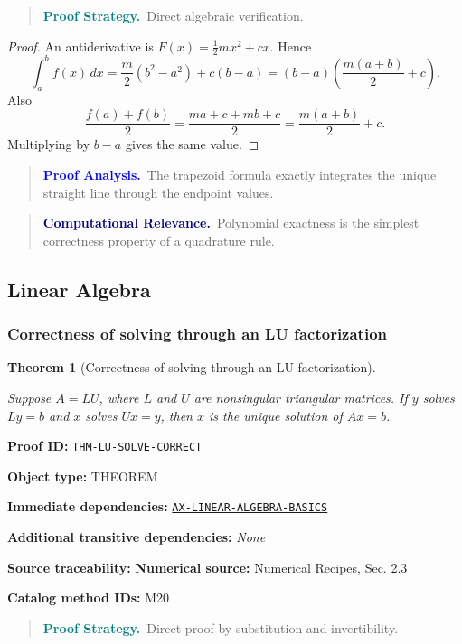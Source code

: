 \documentclass[10pt]{article}
\newcommand{\pidraw}[1]{\begingroup\urlstyle{tt}\nolinkurl{#1}\endgroup}
\newcommand{\pidref}[1]{\hyperref[prf:#1]{\pidraw{#1}}}
\newtheorem{theorem}{Theorem}[section]
\theoremstyle{definition}
\theoremstyle{remark}
\newenvironment{proofstrategy}
{\begin{quote}\small\noindent\textbf{\textcolor{teal}{Proof Strategy.}}\ }
{\end{quote}}
\newenvironment{proofanalysis}
{\begin{quote}\small\noindent\textbf{\textcolor{blue}{Proof Analysis.}}\ }
{\end{quote}}
\newenvironment{computationalrelevance}
{\begin{quote}\small\noindent\textbf{\textcolor{navy}{Computational Relevance.}}\ }
{\end{quote}}
\newcommand{\meta}[2]{\noindent\textbf{#1:} #2\par}
\begin{document}
\begin{proofstrategy}Direct algebraic verification.\end{proofstrategy}

\begin{proof}

An antiderivative is $F(x)=\tfrac12mx^2+cx$. Hence
\[
\int_a^b f(x)\,dx
=
\frac{m}{2}(b^2-a^2)+c(b-a)
=
(b-a)\left(\frac{m(a+b)}2+c\right).
\]
Also
\[
\frac{f(a)+f(b)}2
=
\frac{ma+c+mb+c}{2}
=
\frac{m(a+b)}2+c.
\]
Multiplying by $b-a$ gives the same value.

\end{proof}

\begin{proofanalysis}The trapezoid formula exactly integrates the unique straight line through the endpoint values.\end{proofanalysis}

\begin{computationalrelevance}Polynomial exactness is the simplest correctness property of a quadrature rule.\end{computationalrelevance}

\subsection{Linear Algebra}

\subsubsection{Correctness of solving through an LU factorization}

\begin{theorem}[Correctness of solving through an LU factorization]\label{prf:THM-LU-SOLVE-CORRECT}

Suppose $A=LU$, where $L$ and $U$ are nonsingular triangular matrices. If $y$ solves $Ly=b$ and $x$ solves $Ux=y$, then $x$ is the unique solution of $Ax=b$.

\end{theorem}

\meta{Proof ID}{\pidraw{THM-LU-SOLVE-CORRECT}}
\meta{Object type}{THEOREM}
\meta{Immediate dependencies}{\pidref{AX-LINEAR-ALGEBRA-BASICS}}
\meta{Additional transitive dependencies}{\emph{None}}
\meta{Source traceability}{\textbf{Numerical source:} Numerical Recipes, Sec. 2.3}
\meta{Catalog method IDs}{M20}

\begin{proofstrategy}Direct proof by substitution and invertibility.\end{proofstrategy}
\end{document}
